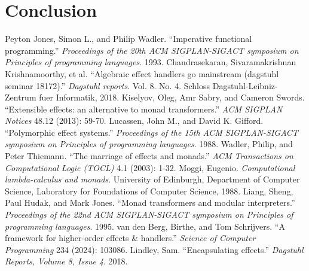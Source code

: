 \documentclass[conference]{IEEEtran}
\begin{document}


    \section{Conclusion}



%


    \begin{thebibliography}{00}
         Peyton Jones, Simon L., and Philip Wadler. ``Imperative functional programming.'' \textit{Proceedings of the 20th ACM SIGPLAN-SIGACT symposium on Principles of programming languages}. 1993.
         Chandrasekaran, Sivaramakrishnan Krishnamoorthy, et al. ``Algebraic effect handlers go mainstream (dagstuhl seminar 18172).'' \textit{Dagstuhl reports}. Vol. 8. No. 4. Schloss Dagstuhl-Leibniz-Zentrum fuer Informatik, 2018.
         Kiselyov, Oleg, Amr Sabry, and Cameron Swords. ``Extensible effects: an alternative to monad transformers.'' \textit{ACM SIGPLAN Notices} 48.12 (2013): 59-70.
         Lucassen, John M., and David K. Gifford. ``Polymorphic effect systems.'' \textit{Proceedings of the 15th ACM SIGPLAN-SIGACT symposium on Principles of programming languages}. 1988.
         Wadler, Philip, and Peter Thiemann. ``The marriage of effects and monads.'' \textit{ACM Transactions on Computational Logic (TOCL)} 4.1 (2003): 1-32.
         Moggi, Eugenio. \textit{Computational lambda-calculus and monads}. University of Edinburgh, Department of Computer Science, Laboratory for Foundations of Computer Science, 1988.
         Liang, Sheng, Paul Hudak, and Mark Jones. ``Monad transformers and modular interpreters.'' \textit{Proceedings of the 22nd ACM SIGPLAN-SIGACT symposium on Principles of programming languages}. 1995.
         van den Berg, Birthe, and Tom Schrijvers. ``A framework for higher-order effects \& handlers.'' \textit{Science of Computer Programming} 234 (2024): 103086.
         Lindley, Sam. ``Encapsulating effects.'' \textit{Dagstuhl Reports, Volume 8, Issue 4}. 2018.

\end{thebibliography}
\end{document}
